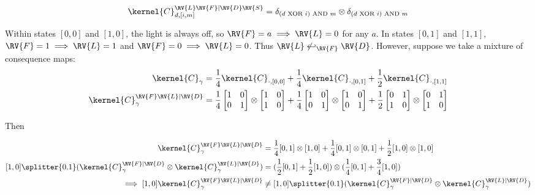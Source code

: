 \begin{align}
    \kernel{C}^{\RV{L}\RV{F}|\RV{D}\RV{S}}_{d,[i,m]} = \delta_{(d\text{ XOR }i)\text{ AND }m}\otimes \delta_{(d\text{ XOR }i)\text{ AND }m}
\end{align}

Within states $[0,0]$ and $[1,0]$, the light is always off, so $\RV{F}=a\implies \RV{L}=0$ for any $a$. In states $[0,1]$ and $[1,1]$, $\RV{F}=1\implies \RV{L}=1$ and $\RV{F}=0\implies \RV{L}=0$. Thus $\RV{L}\not\hookleftarrow_{\RV{F}} \RV{D}$. However, suppose we take a mixture of consequence maps:
\begin{align}
    \kernel{C}_\gamma &= \frac{1}{4}\kernel{C}_{\cdot,[0,0]} + \frac{1}{4}\kernel{C}_{\cdot,[0,1]} + \frac{1}{2}\kernel{C}_{\cdot,[1,1]}\\
    \kernel{C}^{\RV{F}\RV{L}|\RV{D}}_\gamma &= \frac{1}{4} \left[\begin{matrix}
                        1 & 0\\ 0 & 1
                      \end{matrix}\right]\otimes \left[\begin{matrix}
                        1 & 0\\ 1 & 0
                      \end{matrix}\right] + \frac{1}{4} \left[\begin{matrix}
                        1 & 0\\ 0 & 1
                      \end{matrix}\right]\otimes \left[\begin{matrix}
                        1 & 0\\ 0 & 1
                      \end{matrix}\right] + \frac{1}{2}\left[\begin{matrix}
                        0 & 1\\ 1 & 0
                      \end{matrix}\right]\otimes \left[\begin{matrix}
                        0 & 1\\ 1 & 0
                      \end{matrix}\right]
\end{align}

Then

\begin{align}
    [1,0]\kernel{C}^{\RV{F}\RV{L}|\RV{D}}_{\gamma} &= \frac{1}{4}[0,1]\otimes[1,0]+\frac{1}{4}[0,1]\otimes[0,1]+\frac{1}{2}[1,0]\otimes[1,0]\\
    [1,0]\splitter{0.1}(\kernel{C}^{\RV{F}|\RV{D}}_\gamma\otimes \kernel{C}^{\RV{L}|\RV{D}}_\gamma) &= (\frac{1}{2}[0,1]+\frac{1}{2}[1,0])\otimes(\frac{1}{4}[0,1]+\frac{3}{4}[1,0])\\
    \implies [1,0]\kernel{C}^{\RV{F}\RV{L}|\RV{D}}_{\gamma} &\neq [1,0] \splitter{0.1} (\kernel{C}^{\RV{F}|\RV{D}}_\gamma\otimes \kernel{C}^{\RV{L}|\RV{D}}_\gamma)
\end{align}

